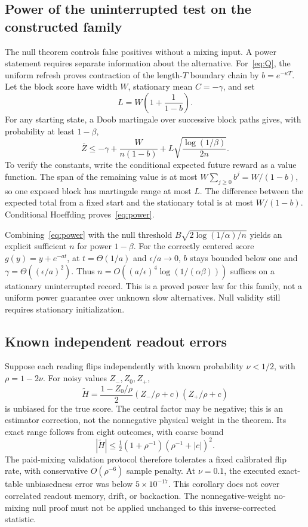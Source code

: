 \documentclass[11pt,a4paper]{article}
\begin{document}
\subsection{Power of the uninterrupted test on the constructed family}
The null theorem controls false positives without a mixing input. A power statement requires separate information about the alternative. For~\eqref{eq:Q}, the uniform refresh proves contraction of the length-$T$ boundary chain by $b=e^{-\kappa T}$. Let the block score have width $W$, stationary mean $C=-\gamma$, and set
\[
L=W\left(1+\frac1{1-b}\right).
\]
For any starting state, a Doob martingale over successive block paths gives, with probability at least $1-\beta$,
\begin{equation}\label{eq:power}
\overline Z\leq-\gamma+\frac{W}{n(1-b)}
       +L\sqrt{\frac{\log(1/\beta)}{2n}}.
\end{equation}
To verify the constants, write the conditional expected future reward as a value function. The span of the remaining value is at most $W\sum_{j\geq0}b^j=W/(1-b)$, so one exposed block has martingale range at most $L$. The difference between the expected total from a fixed start and the stationary total is at most $W/(1-b)$. Conditional Hoeffding proves~\eqref{eq:power}.

Combining~\eqref{eq:power} with the null threshold $B\sqrt{2\log(1/\alpha)/n}$ yields an explicit sufficient $n$ for power $1-\beta$. For the correctly centered score $g(y)=y+e^{-at}$, at $t=\Theta(1/a)$ and $\epsilon/a\to0$, $b$ stays bounded below one and $\gamma=\Theta((\epsilon/a)^2)$. Thus $n=O((a/\epsilon)^4\log(1/(\alpha\beta)))$ suffices on a stationary uninterrupted record. This is a proved power law for this family, not a uniform power guarantee over unknown slow alternatives. Null validity still requires stationary initialization.

\subsection{Known independent readout errors}
Suppose each reading flips independently with known probability $\nu<1/2$, with $\rho=1-2\nu$. For noisy values $Z_-,Z_0,Z_+$,
\[
\widetilde H=\frac{1-Z_0/\rho}{2}
       (Z_-/\rho+c)(Z_+/\rho+c)
\]
is unbiased for the true score. The central factor may be negative; this is an estimator correction, not the nonnegative physical weight in the theorem. Its exact range follows from eight outcomes, with coarse bound
\[
|\widetilde H|\leq\tfrac12(1+\rho^{-1})(\rho^{-1}+|c|)^2.
\]
The paid-mixing validation protocol therefore tolerates a fixed calibrated flip rate, with conservative $O(\rho^{-6})$ sample penalty. At $\nu=0.1$, the executed exact-table unbiasedness error was below $5\times10^{-17}$. This corollary does not cover correlated readout memory, drift, or backaction. The nonnegative-weight no-mixing null proof must not be applied unchanged to this inverse-corrected statistic.
\end{document}
